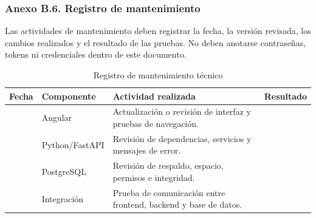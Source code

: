 \subsubsection{Anexo B.6. Registro de mantenimiento}
Las actividades de mantenimiento deben registrar la fecha, la versión revisada, los cambios realizados y el resultado de las pruebas. No deben anotarse contraseñas, tokens ni credenciales dentro de este documento.

\begin{longtable}{p{2.3cm}p{3.2cm}p{5.2cm}p{2.0cm}}
\caption{Registro de mantenimiento técnico}\label{tab:B_registro_mantenimiento}\\
\toprule
\textbf{Fecha} & \textbf{Componente} & \textbf{Actividad realizada} & \textbf{Resultado}\\
\midrule
 & Angular & Actualización o revisión de interfaz y pruebas de navegación. & \\
 & Python/FastAPI & Revisión de dependencias, servicios y mensajes de error. & \\
 & PostgreSQL & Revisión de respaldo, espacio, permisos e integridad. & \\
 & Integración & Prueba de comunicación entre frontend, backend y base de datos. & \\
\bottomrule
\end{longtable}
